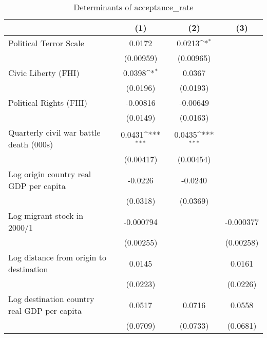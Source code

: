 \begin{table}[htbp]\centering
\def\sym#1{\ifmmode^{#1}\else\(^{#1}\)\fi}
\caption{Determinants of acceptance\_rate}
\begin{tabular}{l*{3}{c}}
\hline\hline
                    &\multicolumn{1}{c}{(1)}         &\multicolumn{1}{c}{(2)}         &\multicolumn{1}{c}{(3)}         \\
\hline
Political Terror Scale&      0.0172         &      0.0213\sym{*}  &                     \\
                    &   (0.00959)         &   (0.00965)         &                     \\
[1em]
Civic Liberty (FHI) &      0.0398\sym{*}  &      0.0367         &                     \\
                    &    (0.0196)         &    (0.0193)         &                     \\
[1em]
Political Rights (FHI)&    -0.00816         &    -0.00649         &                     \\
                    &    (0.0149)         &    (0.0163)         &                     \\
[1em]
Quarterly civil war battle death (000s)&      0.0431\sym{***}&      0.0435\sym{***}&                     \\
                    &   (0.00417)         &   (0.00454)         &                     \\
[1em]
Log origin country real GDP per capita&     -0.0226         &     -0.0240         &                     \\
                    &    (0.0318)         &    (0.0369)         &                     \\
[1em]
Log migrant stock in 2000/1&   -0.000794         &                     &   -0.000377         \\
                    &   (0.00255)         &                     &   (0.00258)         \\
[1em]
Log distance from origin to destination&      0.0145         &                     &      0.0161         \\
                    &    (0.0223)         &                     &    (0.0226)         \\
[1em]
Log destination country real GDP per capita&      0.0517         &      0.0716         &      0.0558         \\
                    &    (0.0709)         &    (0.0733)         &    (0.0681)         \\

\end{tabular}
\end{table}
